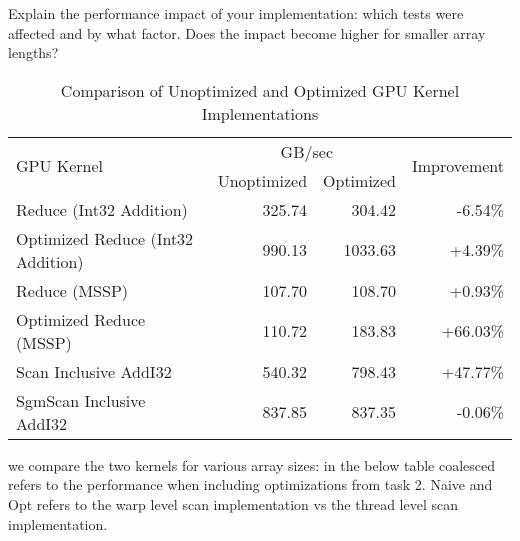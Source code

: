 \documentclass{article}
\begin{document}
Explain the performance impact of your implementation: which tests were affected and by what factor. Does the impact become higher for smaller array lengths?
\begin{table}[h]
  \centering
  \begin{tabular}{|l|r|r|r|}
  \hline
  \multirow{2}{*}{GPU Kernel} & \multicolumn{2}{c|}{GB/sec} & \multirow{2}{*}{Improvement} \\
  \cline{2-3}
   & Unoptimized & Optimized & \\
  \hline
  Reduce (Int32 Addition) & 325.74 & 304.42 & -6.54\% \\
  \hline
  Optimized Reduce (Int32 Addition) & 990.13 & 1033.63 & +4.39\% \\
  \hline
  Reduce (MSSP) & 107.70 & 108.70 & +0.93\% \\
  \hline
  Optimized Reduce (MSSP) & 110.72 & 183.83 & +66.03\% \\
  \hline
  Scan Inclusive AddI32 & 540.32 & 798.43 & +47.77\% \\
  \hline
  SgmScan Inclusive AddI32 & 837.85 & 837.35 & -0.06\% \\
  \hline
  \end{tabular}
  \caption{Comparison of Unoptimized and Optimized GPU Kernel Implementations}
  \label{tab:gpu-kernel-comparison}
\end{table}


we compare the two kernels for various array sizes:
in the below table coalesced refers to the performance when including optimizations from task 2.
Naive and Opt refers to the warp level scan implementation vs the thread level scan implementation.
\end{document}
